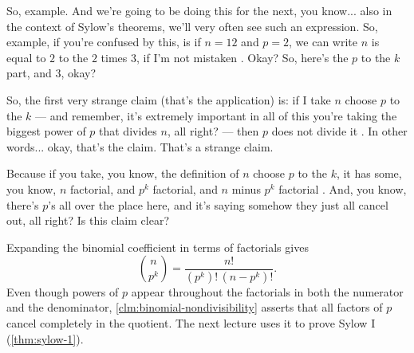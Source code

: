 \begin{speech}[00:26:14 - 00:27:26]
So, example. And we're going to be doing this for the next, you know... also in the context of Sylow's theorems, we'll very often see such an expression. So, example, if you're confused by this, is if $n = 12$ and $p = 2$, we can write $n$ is equal to $2$ to the $2$ times $3$, if I'm not mistaken . Okay? So, here's the $p$ to the $k$ part, and $3$, okay?

So, the first very strange claim (that's the application) is: if I take $n$ choose $p$ to the $k$  --- and remember, it's extremely important in all of this you're taking the biggest power of $p$ that divides $n$, all right? --- then $p$ does not divide it . In other words... okay, that's the claim. That's a strange claim.

Because if you take, you know, the definition of $n$ choose $p$ to the $k$, it has some, you know, $n$ factorial, and $p^k$ factorial, and $n$ minus $p^k$ factorial . And, you know, there's $p$'s all over the place here, and it's saying somehow they just all cancel out, all right? Is this claim clear?
\end{speech}

\begin{content}


Expanding the binomial coefficient in terms of factorials gives
\[
\binom{n}{p^k} = \frac{n!}{(p^k)! \, (n - p^k)!}.
\]
Even though powers of $p$ appear throughout the factorials in both the numerator and the denominator, \cref{clm:binomial-nondivisibility} asserts that all factors of $p$ cancel completely in the quotient. The next lecture uses it to prove Sylow I (\cref{thm:sylow-1}).
\end{content}

